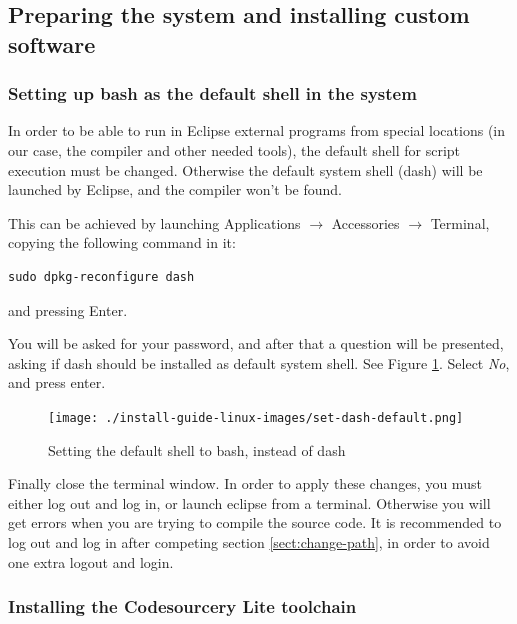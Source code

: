 \documentclass[a4paper, 10pt]{article}
\begin{document}
\subsection{Preparing the system and installing custom software}


\subsubsection{Setting up bash as the default shell in the system}

In order to be able to run in Eclipse external programs from special locations
(in our case, the compiler and other needed tools),
the default shell for script execution must be changed.
Otherwise the default system shell (dash) will be launched by Eclipse,
and the compiler won't be found.

This can be achieved by launching Applications $\rightarrow$ Accessories $\rightarrow$ Terminal,
copying the following command in it:

\begin{verbatim}
sudo dpkg-reconfigure dash
\end{verbatim}

and pressing Enter.

You will be asked for your password,
and after that a question will be presented, asking
if dash should be installed as default system shell.
See Figure \ref{fig:set-dash-default}.
Select \emph{No}, and press enter.

    \begin{figure}[H]
    \centering
        \texttt{[image: ./install-guide-linux-images/set-dash-default.png]}
        \caption{Setting the default shell to bash, instead of dash}
        \label{fig:set-dash-default}
    \end{figure}

Finally close the terminal window.
In order to apply these changes, you must either log out and log in,
or launch eclipse from a terminal.
Otherwise you will get errors when you are trying to compile the source code.
It is recommended to log out and log in after
competing section \ref{sect:change-path}, in order to avoid one extra logout and login.

\subsubsection{Installing the Codesourcery Lite toolchain}
\end{document}
